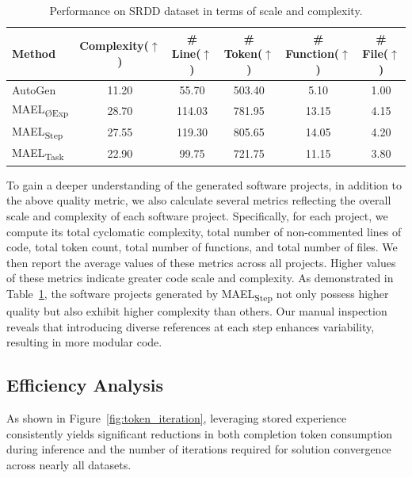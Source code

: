 \documentclass[preprint]{article}
\begin{document}
\begin{table}[t]
\centering
\caption{Performance on SRDD dataset in terms of scale and complexity.} 
\label{tab:scale}
{ 
  \begin{tabular}{l|ccccc}
    \toprule
       \textbf{Method} 
      & \textbf{Complexity($\uparrow$)} 
      & \textbf{\# Line($\uparrow$)} 
      & \textbf{\# Token($\uparrow$)} 
      & \textbf{\# Function($\uparrow$)} 
      & \textbf{\# File($\uparrow$)} \\
    \midrule

    
    \rowcolor{gray!15}
    AutoGen                    
      & 11.20 &  55.70 & 503.40 &  5.10 & 1.00 \\
    \midrule

    
    MAEL\textsubscript{ØExp}  
      & 28.70 & 114.03 & 781.95 & 13.15 & 4.15 \\
    \rowcolor{gray!15}
    MAEL\textsubscript{Step}  
      & 27.55 & 119.30 & 805.65 & 14.05 & 4.20 \\
    MAEL\textsubscript{Task}  
      & 22.90 &  99.75 & 721.75 & 11.15 & 3.80 \\
    \bottomrule
  \end{tabular}
} 


\end{table}


To gain a deeper understanding of the generated software projects, in addition to the above quality metric, we also calculate several metrics reflecting the overall scale and complexity of each software project. Specifically, for each project, we compute its total cyclomatic complexity, total number of non-commented lines of code, total token count, total number of functions, and total number of files. We then report the average values of these metrics across all projects. Higher values of these metrics indicate greater code scale and complexity.
As demonstrated in Table~\ref{tab:scale}, the software projects generated by MAEL\textsubscript{Step} not only possess higher quality but also exhibit higher complexity than others.
Our manual inspection reveals that introducing diverse references at each step enhances variability, resulting in more modular code.


\subsection{Efficiency Analysis}
\label{sec:efficiency}

As shown in Figure~\ref{fig:token_iteration}, leveraging stored experience consistently yields significant reductions in both completion token consumption during inference and the number of iterations required for solution convergence across nearly all datasets.
\end{document}
